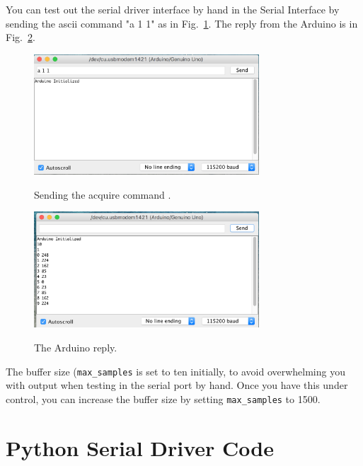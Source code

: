 \documentclass[12pt]{article}
\begin{document}
You can test out the serial driver interface by hand in the Serial Interface by sending the ascii command "a 1 1" as in Fig.~\ref{fig:send}.  The reply from the Arduino is in  Fig.~\ref{fig:reply}.

\begin{figure}[htbp]
\begin{center}
{\includegraphics[width=0.75\textwidth]{figs/send.png}}
\end{center}
\caption{\label{fig:send} Sending the acquire command .}
\end{figure}

\begin{figure}[htbp]
\begin{center}
{\includegraphics[width=0.75\textwidth]{figs/reply.png}}
\end{center}
\caption{\label{fig:reply} The Arduino reply.}
\end{figure}
The buffer size ({\tt max\_samples} is set to ten initially, to avoid overwhelming you with output when testing in the serial port by hand.  Once you have this under control, you can increase the buffer size by setting {\tt max\_samples} to 1500. 

\section{Python Serial Driver Code}
\end{document}
